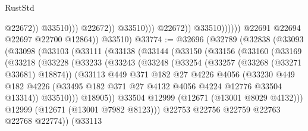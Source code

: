 \begin{lexlean}{RustStd}
\begin{coremodule}
                                              @22672))
                                          @33510)))
                                    @22672))
                                @33510)))
                          @22672))
                      @33510))))))
          @22691
          @22694
          @22697
          @22700
          @12864))
      @33510)
@33774 := @32696
    (@32789
      (@32838
        (@33093
          (@33098
            (@33103
              (@33111
                (@33138
                  (@33144
                    (@33150
                      (@33156
                        (@33160
                          (@33169
                            (@33218
                              (@33228
                                (@33233
                                  (@33243
                                    (@33248
                                      (@33254
                                        (@33257 (@33268 (@33271 @33681) @18874))
                                        (@33113
                                          @449
                                          @371
                                          @182
                                          @27
                                          @4226
                                          @4056
                                          (@33230
                                            @449
                                            @182
                                            @4226
                                            (@33495
                                              @182
                                              @371
                                              @27
                                              @4132
                                              @4056
                                              @4224
                                              @12776
                                              @33504
                                              @13314))
                                          @33510)))
                                    @18905))
                                @33504
                                @12999
                                (@12671 (@13001 @8029 @4132)))
                              @12999
                              (@12671 (@13001 @7982 @8123)))
                            @22753
                            @22756
                            @22759
                            @22763
                            @22768
                            @22774))
                        (@33113

\end{coremodule}
\end{lexlean}
